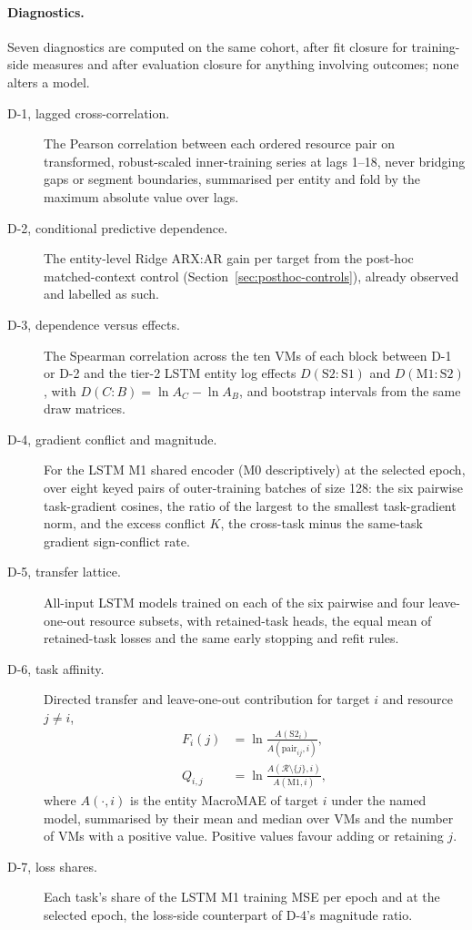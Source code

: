 \documentclass[5p,twocolumn]{elsarticle}
\begin{document}
\paragraph{Diagnostics.} Seven diagnostics are computed on the same cohort,
after fit closure for training-side measures and after evaluation closure for
anything involving outcomes; none alters a model.
\begin{description}
  \item[D-1, lagged cross-correlation.] The Pearson correlation between
    each
    ordered resource pair on transformed, robust-scaled inner-training series
    at lags 1--18, never bridging gaps or segment boundaries, summarised per
    entity and fold by the maximum absolute value over lags.
  \item[D-2, conditional predictive dependence.] The entity-level Ridge
    ARX:AR gain per target from the post-hoc matched-context control
    (Section~\ref{sec:posthoc-controls}), already observed and labelled as
    such.
  \item[D-3, dependence versus effects.] The Spearman correlation across the
    ten VMs of each block between D-1 or D-2 and the tier-2 LSTM entity log
    effects $D(\mathrm{S2}\!:\!\mathrm{S1})$ and
    $D(\mathrm{M1}\!:\!\mathrm{S2})$, with $D(C\!:\!B)=\ln A_C-\ln A_B$, and
    bootstrap intervals from the same draw matrices.
  \item[D-4, gradient conflict and magnitude.] For the LSTM M1 shared encoder
    (M0 descriptively) at the selected epoch, over eight keyed pairs of
    outer-training batches of size 128: the six pairwise task-gradient
    cosines, the ratio of the largest to the smallest task-gradient norm, and
    the excess conflict $K$, the cross-task minus the same-task gradient
    sign-conflict rate.
  \item[D-5, transfer lattice.] All-input LSTM models trained on each of the
    six pairwise and four leave-one-out resource subsets, with retained-task
    heads, the equal mean of retained-task losses and the same early
    stopping and refit rules.
  \item[D-6, task affinity.] Directed transfer and leave-one-out
    contribution for target $i$ and resource $j\neq i$,
    \begin{equation*}
      \begin{aligned}
        F_i(j)&=\ln\frac{A(\mathrm{S2}_i)}{A(\mathrm{pair}_{ij},i)},\\
        Q_{i,j}&=\ln\frac{A(\mathcal{R}\setminus\{j\},i)}{A(\mathrm{M1},i)},
      \end{aligned}
    \end{equation*}
    where $A(\cdot,i)$ is the entity MacroMAE of target $i$ under the named
    model, summarised by their mean and median over VMs
    and the number of VMs with a positive value. Positive values favour
    adding or retaining $j$.
  \item[D-7, loss shares.] Each task's share of the LSTM M1 training MSE per
    epoch and at the selected epoch, the loss-side counterpart of D-4's
    magnitude ratio.
\end{description}
\end{document}
